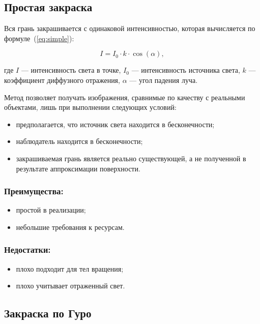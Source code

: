 \subsection{Простая закраска}

Вся грань закрашивается с одинаковой интенсивностью, которая вычисляется по формуле~(\ref{eq:simple}):

\begin{equation}\label{eq:simple}
	I = I_{0} \cdot k \cdot \cos(\alpha),
\end{equation}

\noindent где $I$ --- интенсивность света в точке, $I_{0}$ --- интенсивность источника света, $k$ --- коэффициент диффузного отражения, $\alpha$ --- угол падения луча.

Метод позволяет получать изображения, сравнимые по качеству с реальными объектами, лишь при выполнении следующих условий:

 \begin{itemize}[label=---]
	\item предполагается, что источник света находится в бесконечности;
	\item наблюдатель находится в бесконечности;
	\item закрашиваемая грань является реально существующей, а не полученной в результате аппроксимации поверхности.
\end{itemize}

\subsubsection*{Преимущества:}
\begin{itemize}[label=---]
	\item простой в реализации;
	\item небольшие требования к ресурсам.
\end{itemize}

\subsubsection*{Недостатки:}
\begin{itemize}[label=---]
	\item плохо подходит для тел вращения;
	\item плохо учитывает отраженный свет.
\end{itemize}


\subsection{Закраска по Гуро}

